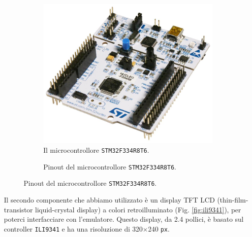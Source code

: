 \documentclass[a4paper]{article}
\begin{document}
\begin{figure}[h!t]
    \begin{subfigure}[b]{0.45\textwidth}
        \begin{center}
            \includegraphics[scale=0.15]{figures/stm32f334.jpg}
        \end{center}
        \caption{Il microcontrollore \texttt{STM32F334R8T6}.}
        \label{fig:stm32f334}
    \end{subfigure}
    \hfill
    \begin{subfigure}[b]{0.45\textwidth}
        \begin{center}
            \begin{tikzpicture}[x=0.015cm, y=0.015cm, scale=0.50, transform shape]
                
            \end{tikzpicture}
        \end{center}
        \caption{Pinout del microcontrollore \texttt{STM32F334R8T6}.}
        \label{fig:pinout_stm32}
    \end{subfigure}
\end{figure}

Il secondo componente che abbiamo utilizzato è un display TFT LCD
(thin-film-transistor liquid-crystal display) a colori retroilluminato
(Fig. \ref{fig:ili9341}),
per poterci interfacciare con l'emulatore. Questo display, da 2.4 pollici,
è basato sul controller \texttt{ILI9341} e ha una risoluzione di
320$\times$240 \texttt{px}.
\end{document}
